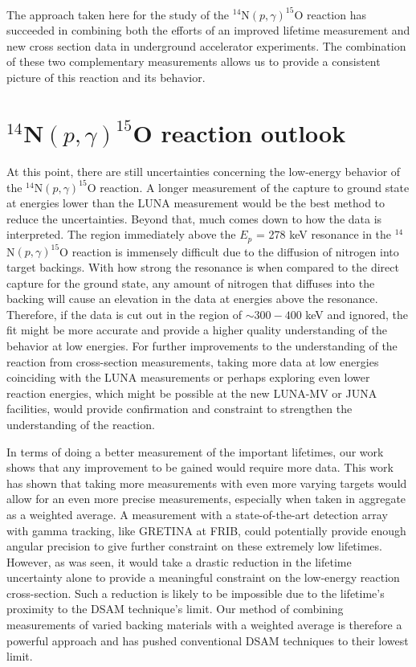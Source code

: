 The approach taken here for the study of the $^{14}$N$(p,\gamma)^{15}$O reaction has succeeded in combining both the efforts of an improved lifetime measurement and new cross section data in underground accelerator experiments. The combination of these two complementary measurements allows us to provide a consistent picture of this reaction and its behavior. 


\section{$^{14}$N$\left( p,\gamma \right) ^{15}$O reaction outlook}
\label{sec: outlook}

At this point, there are still uncertainties concerning the low-energy behavior of the $^{14}$N$\left( p,\gamma \right) ^{15}$O reaction. A longer measurement of the capture to ground state at energies lower than the LUNA measurement would be the best method to reduce the uncertainties. Beyond that, much comes down to how the data is interpreted. The region immediately above the $E_{p}$ = 278 keV resonance in the $^{14}$N$\left( p,\gamma \right) ^{15}$O reaction is immensely difficult due to the diffusion of nitrogen into target backings. With how strong the resonance is when compared to the direct capture for the ground state, any amount of nitrogen that diffuses into the backing will cause an elevation in the data at energies above the resonance. Therefore, if the data is cut out in the region of $\sim 300 - 400$ keV and ignored, the fit might be more accurate and provide a higher quality understanding of the behavior at low energies. For further improvements to the understanding of the reaction from cross-section measurements, taking more data at low energies coinciding with the LUNA measurements or perhaps exploring even lower reaction energies, which might be possible at the new LUNA-MV or JUNA facilities, would provide confirmation and constraint to strengthen the understanding of the reaction. 

In terms of doing a better measurement of the important lifetimes, our work shows that any improvement to be gained would require more data. This work has shown that taking more measurements with even more varying targets would allow for an even more precise measurements, especially when taken in aggregate as a weighted average. A measurement with a state-of-the-art detection array with gamma tracking, like GRETINA at FRIB, could potentially provide enough angular precision to give further constraint on these extremely low lifetimes. However, as was seen, it would take a drastic reduction in the lifetime uncertainty alone to provide a meaningful constraint on the low-energy reaction cross-section. Such a reduction is likely to be impossible due to the lifetime's proximity to the DSAM technique's limit. Our method of combining measurements of varied backing materials with a weighted average is therefore a powerful approach and has pushed conventional DSAM techniques to their lowest limit. 



%
% 
% 
